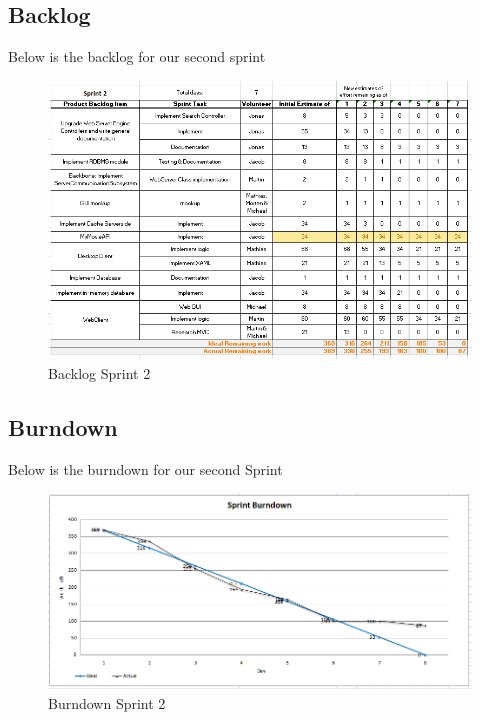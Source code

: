 \subsection{Backlog}
Below is the backlog for our second sprint
\begin{figure}[h]
\begin{center}
\includegraphics[scale=0.6]{img/SCRUM/backlogSprint2.png}
\caption{Backlog Sprint 2}
\label{fig:Backlog Sprint 2}
\end{center}
\end{figure}

\newpage
\subsection{Burndown}
Below is the burndown for our second Sprint
\begin{figure}[h]
\begin{center}
\includegraphics[scale=0.55]{img/SCRUM/burndownSprint2.png}
\caption{Burndown Sprint 2}
\label{fig:Burndown Sprint 2}
\end{center}
\end{figure}


